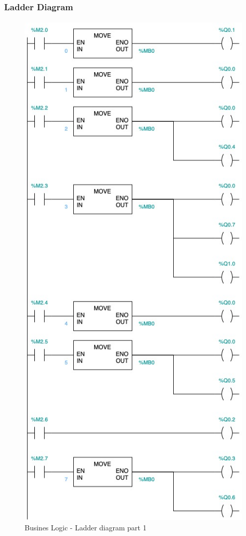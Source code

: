 \documentclass[12pt]{beamer}
\begin{document}
\begin{frame}
\frametitle{Ladder Diagram}
\framesubtitle{}
\begin{figure}
    \centering
    \includegraphics[trim={0 25cm 0 0}, clip, scale=.5]{img/Ladder_diagram_3.jpg}
    \caption{Busines Logic - Ladder diagram part 1}
    \label{fig:ladder31}
\end{figure}
\end{frame}
\end{document}
